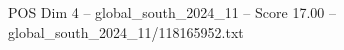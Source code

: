\begin{textsample}{POS Dim 4 – global\_south\_2024\_11 – Score 17.00 – global\_south\_2024\_11/118165952.txt}
\end{textsample}
